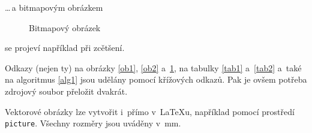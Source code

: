 \documentclass[11pt,a4paper]{article}
\begin{document}
  \noindent
  \dots\,a bitmapovým obrázkem
  \begin{figure}[ht]
    \centering
    \caption{Bitmapový obrázek}
    \label{ob3}
  \end{figure}

  \noindent
  se projeví například při zcětšení.

  Odkazy (nejen ty) na obrázky \ref{ob1}, \ref{ob2} a~\ref{ob3}, na tabulky \ref{tab1}
  a~\ref{tab2} a~také na algoritmus \ref{alg1} jsou udělány pomocí křížových odkazů. Pak je ovšem
  potřeba zdrojový soubor přeložit dvakrát.

  Vektorové obrázky lze vytvořit i~přímo v~\LaTeX u, například pomocí prostředí
  \texttt{picture}. Všechny rozměry jsou uváděny v~mm.
\end{document}
